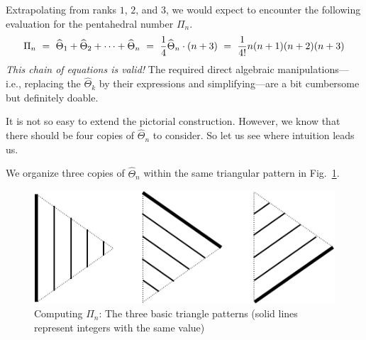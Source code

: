 \medskip

Extrapolating from ranks $1$, $2$, and $3$, we would expect to encounter the following evaluation for the pentahedral number $\Pi_n$.
\[
\Pi_n \ = \ \widehat{\Theta}_1 + \widehat{\Theta}_2 + \cdots + \widehat{\Theta}_n \ = \
{1 \over 4} \widehat{\Theta}_n \cdot (n+3) \ = \ {1 \over 4!} n(n+1)(n+2)(n+3) 
\]
{\em This chain of equations is valid!}  The required direct algebraic manipulations---i.e., replacing the $\widehat{\Theta}_k$ by their expressions and simplifying---are a bit cumbersome but definitely doable.

\smallskip

It is not so easy to extend the pictorial construction.  However, we know that there should be four copies of $\widehat{\Theta}_n$ to consider.  So let us see where intuition leads us.

\smallskip

We organize three copies of $\widehat{\Theta}_n$ within the same triangular pattern in Fig.~\ref{fig:Tetrahedral6}.
\begin{figure}[h]
\begin{center}
        \includegraphics[scale=0.3]{FiguresArithmetic/appTetrahedral6}
        \caption{Computing $\Pi_n$: The three basic triangle patterns (solid lines represent integers with the same value)}
        \label{fig:Tetrahedral6}
\end{center}
\end{figure}

